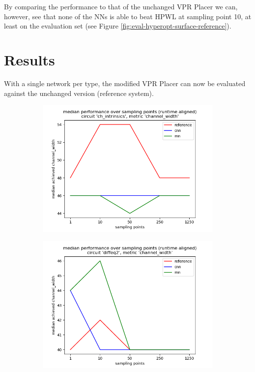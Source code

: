 By comparing the performance to that of the unchanged \gls{VPR} Placer we can, however, see that none of the \glspl{NN} is able to beat \gls{HPWL} at sampling point 10, at least on the evaluation set (see Figure \ref{fig:eval-hyperopt-surface-reference}).

\section{Results}

With a single network per type, the modified \gls{VPR} Placer can now be evaluated against the unchanged version (reference system).

\begin{figure}
	\centering
	\begin{subfigure}[b]{0.49\linewidth}
		\includegraphics[width=\linewidth]{plots/eval-ch_intrinsics-chan-width-median-full.png}
	\end{subfigure}
	\begin{subfigure}[b]{0.49\linewidth}
		\includegraphics[width=\linewidth]{plots/eval-diffeq2-chan-width-median-full.png}

\end{subfigure}
\end{figure}
